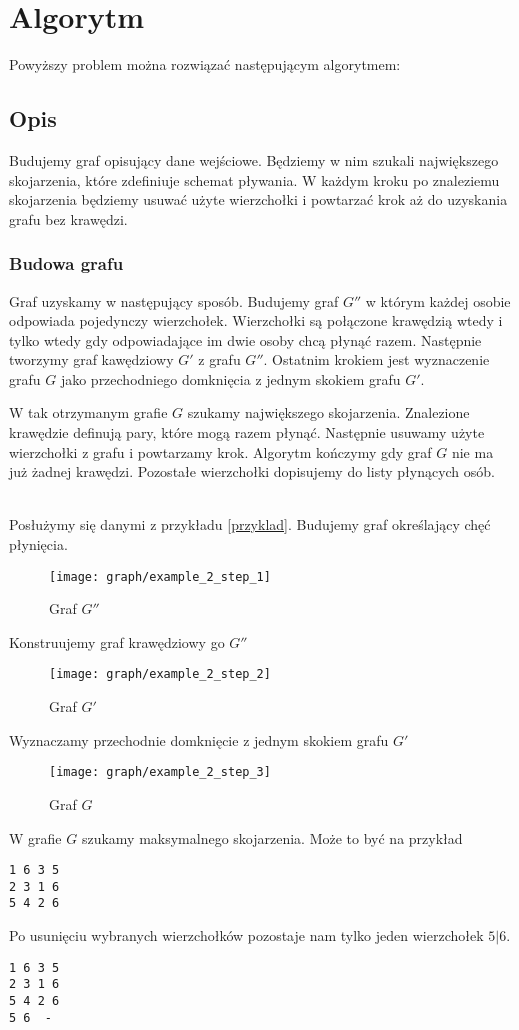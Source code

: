 \documentclass{llncs}
\begin{document}
\section{Algorytm}
Powyższy problem można rozwiązać następującym algorytmem:

\subsection{Opis}
Budujemy graf opisujący dane wejściowe. Będziemy w nim szukali 
największego skojarzenia, które zdefiniuje schemat pływania.
W każdym kroku po znaleziemu skojarzenia będziemy usuwać 
użyte wierzchołki i powtarzać krok aż do uzyskania grafu bez krawędzi.

\subsubsection{Budowa grafu}
Graf uzyskamy w następujący sposób. Budujemy
graf $G''$ w którym każdej osobie odpowiada pojedynczy 
wierzchołek. Wierzchołki są połączone krawędzią wtedy
i tylko wtedy gdy odpowiadające im dwie osoby chcą płynąć razem.
Następnie tworzymy graf kawędziowy $G'$ z grafu $G''$.
Ostatnim krokiem jest wyznaczenie grafu $G$
jako przechodniego domknięcia z jednym 
skokiem grafu $G'$.

W tak otrzymanym grafie $G$ szukamy największego 
skojarzenia. Znalezione krawędzie definują
pary, które mogą razem płynąć. Następnie usuwamy użyte
wierzchołki z grafu i powtarzamy krok.
Algorytm kończymy gdy graf $G$ nie ma już żadnej krawędzi.
Pozostałe wierzchołki dopisujemy do listy płynących
osób.
\begin{example}~\\
Posłużymy się danymi z przykładu \ref{przyklad}.
Budujemy graf określający chęć płynięcia.
\begin{figure}[H]
  \caption{Graf $G''$}
  \centering
	\texttt{[image: graph/example\_2\_step\_1]}
\end{figure}
Konstruujemy graf krawędziowy go $G''$
\begin{figure}[H]
  \caption{Graf $G'$}
  \centering
	\texttt{[image: graph/example\_2\_step\_2]}
\end{figure}
Wyznaczamy przechodnie domknięcie z jednym skokiem grafu $G'$
\begin{figure}[H]
  \caption{Graf $G$}
  \centering
	\texttt{[image: graph/example\_2\_step\_3]}
\end{figure}

W grafie $G$ szukamy maksymalnego skojarzenia. Może to być na przykład
\begin{lstlisting}[title=Możliwe skojarzenie]
1 6	3 5
2 3	1 6
5 4	2 6
\end{lstlisting}
Po usunięciu wybranych wierzchołków pozostaje nam tylko jeden 
wierzchołek $5|6$.
\begin{lstlisting}[title=Możliwy rozkład pływania]
1 6	3 5
2 3	1 6
5 4	2 6
5 6	 -
\end{lstlisting}

\end{example}
\end{document}
